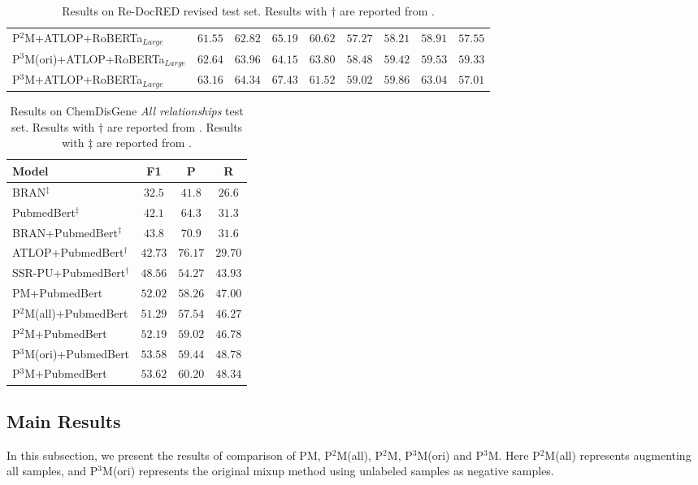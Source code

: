 \documentclass[11pt]{article}
\begin{document}
\begin{table}[!ht]
\begin{tabular}{lcccc|cccc}
P$^{2}$M+ATLOP+RoBERTa$_{Large}$ & $61.55$ & $62.82$ & $65.19$ & $60.62$ & $57.27$ & $58.21$ & $58.91$ & $57.55$ \\
P$^{3}$M(ori)+ATLOP+RoBERTa$_{Large}$ & $62.64$ & $63.96$ & $64.15$ & $\mathbf{63.80}$ & $58.48$ & $59.42$ & $59.53$ & $59.33$ \\
P$^{3}$M+ATLOP+RoBERTa$_{Large}$ & $\mathbf{63.16}$ & $\mathbf{64.34}$ & $67.43$ & $61.52$ & $\mathbf{59.02}$ & $\mathbf{59.86}$ & $63.04$ & $57.01$ \\
\bottomrule
\end{tabular}
\caption{\label{tab2}
Results on Re-DocRED revised test set. Results with $\dagger$ are reported from \citep{wang2022unified}.
}
\end{table}

\begin{table}[!ht]
\centering
\small
\begin{tabular}{lccc}
\toprule
\textbf{Model} & F1 & P & R \\
\midrule BRAN$^{\ddagger}$ & $32.5$ & $41.8$ & $26.6$ \\
PubmedBert$^{\ddagger}$ & $42.1$ & $64.3$ & $31.3$ \\
BRAN+PubmedBert$^{\ddagger}$ & $43.8$ & $70.9$ & $31.6$ \\
\midrule
ATLOP+PubmedBert$^{\dagger}$ & $42.73$ & $\mathbf{76.17} $ & $29.70$ \\
SSR-PU+PubmedBert$^{\dagger}$ & $48.56$ & $54.27$ & $43.93$ \\
PM+PubmedBert & $52.02$ & $58.26$ & $47.00$ \\
P$^{2}$M(all)+PubmedBert & $51.29$ & $57.54$ & $46.27$ \\
P$^{2}$M+PubmedBert & $52.19$ & $59.02$ & $46.78$ \\
P$^{3}$M(ori)+PubmedBert & $53.58$ & $59.44$ & $\mathbf{48.78}$ \\
P$^{3}$M+PubmedBert & $\mathbf{53.62}$ & $60.20$ & $48.34$ \\
\bottomrule
\end{tabular}
\caption{\label{tab3}
Results on ChemDisGene \emph{All relationships} test set. Results with $\dagger$ are reported from \citep{wang2022unified}. Results with $\ddagger$ are reported from \citep{zhang-etal-2022-distant}.
}
\end{table}

\subsection{Main Results}\label{sec4.2}
In this subsection, we present the results of comparison of PM, P$^{2}$M(all), P$^{2}$M, P$^{3}$M(ori) and P$^{3}$M. Here P$^{2}$M(all) represents augmenting all samples, and P$^{3}$M(ori) represents the original mixup method using unlabeled samples as negative samples.
\end{document}
